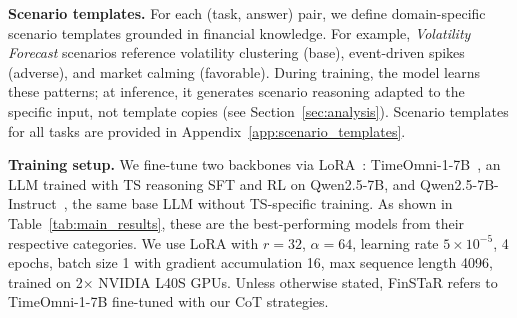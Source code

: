 \textbf{Scenario templates.}
For each (task, answer) pair, we define domain-specific scenario templates grounded in financial knowledge.
For example, \textit{Volatility Forecast} scenarios reference volatility clustering (base), event-driven spikes (adverse), and market calming (favorable).
During training, the model learns these patterns; at inference, it generates scenario reasoning adapted to the specific input, not template copies (see Section~\ref{sec:analysis}).
Scenario templates for all tasks are provided in Appendix~\ref{app:scenario_templates}.

\textbf{Training setup.}
We fine-tune two backbones via LoRA~\cite{hu2022lora}: TimeOmni-1-7B~\cite{timeomni1}, an LLM trained with TS reasoning SFT and RL on Qwen2.5-7B, and Qwen2.5-7B-Instruct~\cite{qwen2025qwen25}, the same base LLM without TS-specific training.
As shown in Table~\ref{tab:main_results}, these are the best-performing models from their respective categories.
We use LoRA with $r{=}32$, $\alpha{=}64$,
learning rate $5{\times}10^{-5}$, 4 epochs, batch size 1 with gradient accumulation 16, max sequence length 4096, trained on 2$\times$ NVIDIA L40S GPUs.
Unless otherwise stated, FinSTaR refers to TimeOmni-1-7B fine-tuned with our CoT strategies.

